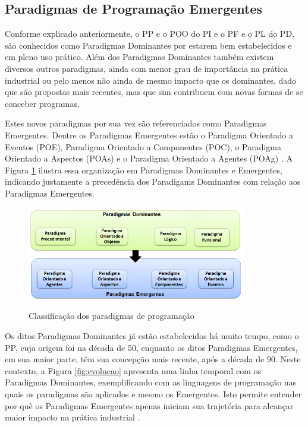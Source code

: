 \subsection{Paradigmas de Programação Emergentes}\label{sec:intro_emergentes}

Conforme explicado anteriormente, o PP e o POO do PI e o PF e o PL do PD, são
conhecidos como Paradigmas Dominantes por estarem bem estabelecidos e em pleno
uso prático. Além dos Paradigmas Dominantes também existem diversos outros
paradigmas, ainda com menor grau de importância na prática industrial ou pelo
menos não ainda de mesmo impacto que os dominantes, dado que são propostas mais
recentes, mas que sim contribuem com novas formas de se conceber programas.

Estes novos paradigmas por sua vez são referenciados como Paradigmas Emergentes.
Dentre os Paradigmas Emergentes estão o Paradigma Orientado a Eventos (POE),
Paradigma Orientado a Componentes (POC), o Paradigma Orientado a Aspectos (POAs)
e o Paradigma Orientado a Agentes (POAg) \cite{msc_Banaszewski_2009}. A Figura
\ref{fig:emergentes} ilustra essa organização em Paradigmas Dominantes e
Emergentes, indicando justamente a precedência dos Paradigams Dominantes com
relação aos Paradigmas Emergentes.

\begin{figure}[!htb]
  \centering
  \caption{Classificação dos paradigmas de programação}
  \includegraphics[width=0.85\textwidth]{../figures/classificacao_cut3.png}
  \label{fig:emergentes}
\end{figure}

Os ditos Paradigmas Dominantes já estão estabelecidos há muito tempo, como o PP,
cuja origem foi na década de 50, enquanto os ditos Paradigmas Emergentes, em sua
maior parte, têm sua concepção mais recente, após a década de 90. Neste
contexto, a Figura \ref{fig:evolucao} apresenta uma linha temporal com os
Paradigmas Dominantes, exemplificando com as linguagens de programação nas quais
os paradigmas são aplicados e mesmo os Emergentes. Isto permite entender por quê
os Paradigmas Emergentes apenas iniciam sua trajetória para alcançar maior
impacto na prática industrial \cite{msc_Banaszewski_2009}.

